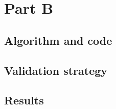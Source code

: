 \section{Part B}

\subsection{Algorithm and code}

\subsection{Validation strategy}

\subsection{Results}